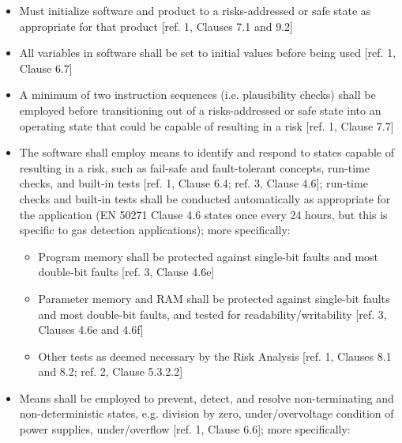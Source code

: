 \documentclass[12pt]{../Common_files/ElisaPaper}
\begin{document}
\begin{itemize}

\item Must initialize software and product to a risks-addressed or safe state as appropriate for that product [ref. 1, Clauses 7.1 and 9.2]

\item All variables in software shall be set to initial values before being used [ref. 1, Clause 6.7]

\item A minimum of two instruction sequences (i.e. plausibility checks) shall be employed before transitioning out of a risks-addressed or safe state into an operating state that could be capable of resulting in a risk [ref. 1, Clause 7.7]

\item The software shall employ means to identify and respond to states capable of resulting in a risk, such as fail-safe and fault-tolerant concepts, run-time checks, and built-in tests [ref. 1, Clause 6.4; ref. 3, Clause 4.6]; run-time checks and built-in tests shall be conducted automatically as appropriate for the application (EN 50271 Clause 4.6 states once every 24 hours, but this is specific to gas detection applications); more specifically:

\begin{itemize}

\item Program memory shall be protected against single-bit faults and most double-bit faults [ref. 3, Clause 4.6e]

\item Parameter memory and RAM shall be protected against single-bit faults and most  double-bit faults, and tested for readability/writability [ref. 3, Clauses 4.6e and 4.6f]

\item Other tests as deemed necessary by the Risk Analysis [ref. 1, Clauses 8.1 and 8.2; ref. 2, Clause 5.3.2.2]

\end{itemize}

\item Means shall be employed to prevent, detect, and resolve non-terminating and non-deterministic states, e.g. division by zero, under/overvoltage condition of power supplies, under/overflow [ref. 1, Clause 6.6]; more specifically:

\begin{itemize}


\end{itemize}
\end{itemize}
\end{document}
